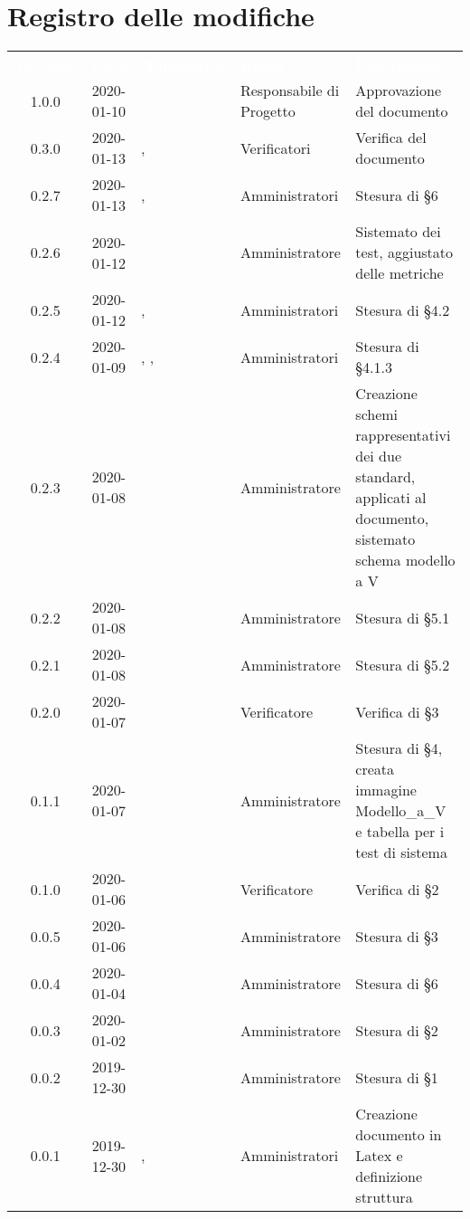\section*{Registro delle modifiche}
{
\renewcommand{\arraystretch}{1.5}
\centering
\begin{longtable}{ c c  C{4cm}  C{3cm} C{4cm}}
\textcolor{white}{\textbf{Versione}} & \textcolor{white}{\textbf{Data}} & \textcolor{white}{\textbf{Nominativo}} & \textcolor{white}{\textbf{Ruolo}} & \textcolor{white}{\textbf{Descrizione}}\\	

1.0.0 & 2020-01-10 & \SE{} & Responsabile di Progetto & Approvazione del documento \\
0.3.0 & 2020-01-13 & \LD{}, \DF{} & Verificatori & Verifica del documento\\

0.2.7 & 2020-01-13 & \MC{}, \AT{} & Amministratori & Stesura di §6 \\
0.2.6 & 2020-01-12 & \AT{} & Amministratore & Sistemato dei test, aggiustato delle metriche \\
0.2.5 & 2020-01-12 & \MC{}, \BR{} & Amministratori & Stesura di §4.2 \\
0.2.4 & 2020-01-09 & \MC{}, \AT{}, \BR{} & Amministratori & Stesura di §4.1.3 \\
0.2.3 & 2020-01-08 & \AT{} & Amministratore & Creazione schemi rappresentativi dei due standard, applicati al documento, sistemato schema modello a V \\
0.2.2 & 2020-01-08 & \MC{} & Amministratore & Stesura di §5.1 \\
0.2.1 & 2020-01-08 & \AT{} & Amministratore & Stesura di §5.2 \\
0.2.0 & 2020-01-07 & \DF{} & Verificatore & Verifica di §3 \\
0.1.1 & 2020-01-07 & \AT{} & Amministratore & Stesura di §4, creata immagine Modello\_a\_V e tabella per i test di sistema \\
0.1.0 & 2020-01-06 & \LD{} & Verificatore & Verifica di §2 \\
0.0.5 & 2020-01-06 & \BR{} & Amministratore & Stesura di §3 \\
0.0.4 & 2020-01-04 & \MC{} & Amministratore & Stesura di §6 \\
0.0.3 & 2020-01-02 & \MC{} & Amministratore & Stesura di §2 \\
0.0.2 & 2019-12-30 & \AT{} & Amministratore & Stesura di §1 \\
0.0.1 & 2019-12-30 & \AT{}, \MC{} & Amministratori & Creazione documento in Latex e definizione struttura \\	
		
\end{longtable}
}
